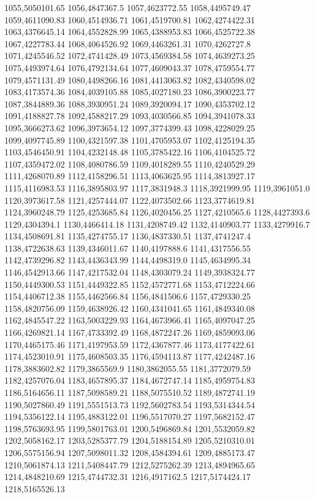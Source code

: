 1055,5050101.65
1056,4847367.5
1057,4623772.55
1058,4495749.47
1059,4611090.83
1060,4514936.71
1061,4519700.81
1062,4274422.31
1063,4376645.14
1064,4552828.99
1065,4388953.83
1066,4525722.38
1067,4227783.44
1068,4064526.92
1069,4463261.31
1070,4262727.8
1071,4245546.52
1072,4741428.49
1073,4569384.58
1074,4639273.25
1075,4493974.64
1076,4792134.64
1077,4609043.37
1078,4759554.77
1079,4571131.49
1080,4498266.16
1081,4413063.82
1082,4340598.02
1083,4173574.36
1084,4039105.88
1085,4027180.23
1086,3900223.77
1087,3844889.36
1088,3930951.24
1089,3920094.17
1090,4353702.12
1091,4188827.78
1092,4588217.29
1093,4030566.85
1094,3941078.33
1095,3666273.62
1096,3973654.12
1097,3774399.43
1098,4228029.25
1099,4097745.89
1100,4321597.38
1101,4705953.07
1102,4125194.35
1103,4546450.91
1104,4232148.48
1105,3785422.16
1106,4104525.72
1107,4359472.02
1108,4080786.59
1109,4018289.55
1110,4240529.29
1111,4268070.89
1112,4158296.51
1113,4063625.95
1114,3813927.17
1115,4116983.53
1116,3895803.97
1117,3831948.3
1118,3921999.95
1119,3961051.0
1120,3973617.58
1121,4257444.07
1122,4073502.66
1123,3774619.81
1124,3960248.79
1125,4253685.84
1126,4020456.25
1127,4210565.6
1128,4427393.6
1129,4304394.1
1130,4466414.18
1131,4208749.42
1132,4140903.77
1133,4279916.7
1134,4508691.81
1135,4274755.17
1136,4837330.51
1137,4741247.4
1138,4722638.63
1139,4346011.67
1140,4197888.6
1141,4317556.55
1142,4739296.82
1143,4436343.99
1144,4498319.0
1145,4634995.34
1146,4542913.66
1147,4217532.04
1148,4303079.24
1149,3938324.77
1150,4449300.53
1151,4449322.85
1152,4572771.68
1153,4712224.66
1154,4406712.38
1155,4462566.84
1156,4841506.6
1157,4729330.25
1158,4820756.09
1159,4638926.42
1160,4341041.65
1161,4849340.08
1162,4845547.22
1163,5003229.93
1164,4673966.41
1165,4097047.25
1166,4269821.14
1167,4733392.49
1168,4872247.26
1169,4859093.06
1170,4465175.46
1171,4197953.59
1172,4367877.46
1173,4177422.61
1174,4523010.91
1175,4608503.35
1176,4594113.87
1177,4242487.16
1178,3883602.82
1179,3865569.9
1180,3862055.55
1181,3772079.59
1182,4257076.04
1183,4657895.37
1184,4672747.14
1185,4959754.83
1186,5164656.11
1187,5098589.21
1188,5075510.52
1189,4872741.19
1190,5027860.49
1191,5551513.73
1192,5602783.54
1193,5314344.54
1194,5356122.14
1195,4883122.01
1196,5517070.27
1197,5682152.47
1198,5763693.95
1199,5801763.01
1200,5496869.84
1201,5532059.82
1202,5058162.17
1203,5285377.79
1204,5188154.89
1205,5210310.01
1206,5575156.94
1207,5098011.32
1208,4584394.61
1209,4885173.47
1210,5061874.13
1211,5408447.79
1212,5275262.39
1213,4894965.65
1214,4848210.69
1215,4744732.31
1216,4917162.5
1217,5174424.17
1218,5165526.13
